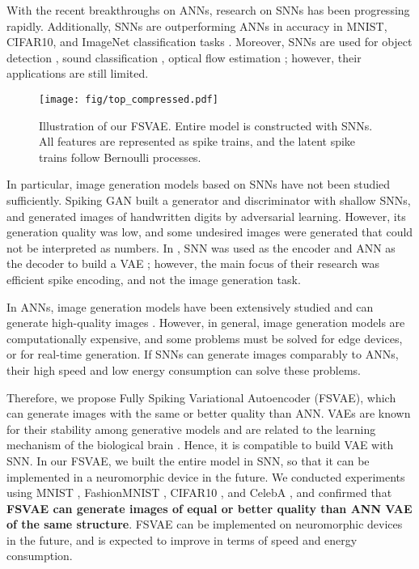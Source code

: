 \documentclass[letterpaper]{article} %
\begin{document}
With the recent breakthroughs on ANNs, research on SNNs has been progressing rapidly. Additionally, SNNs are outperforming ANNs in accuracy in MNIST, CIFAR10, and ImageNet classification tasks \cite{zheng2020going, tsslbp}. Moreover, SNNs are used for object detection \cite{spikingyolo}, sound classification \cite{soundclassification}, optical flow estimation \cite{opticalflow}; however, their applications are still limited.

\begin{figure}[t]
    \centering
    \texttt{[image: fig/top\_compressed.pdf]} 
    \caption{Illustration of our FSVAE. Entire model is constructed with SNNs. All features are represented as spike trains, and the latent spike trains follow Bernoulli processes.}
    \label{fig:top}
\end{figure}

In particular, image generation models based on SNNs have not been studied sufficiently. Spiking GAN \cite{spikinggan} built a generator and discriminator with shallow SNNs, and generated images of handwritten digits by adversarial learning. However, its generation quality was low, and some undesired images were generated that could not be interpreted as numbers. In \cite{dib}, SNN was used as the encoder and ANN as the decoder to build a VAE \cite{vae}; however, the main focus of their research was efficient spike encoding, and not the image generation task.

In ANNs, image generation models have been extensively studied and can generate high-quality images \cite{vqvae2, stylegan2}. However, in general, image generation models are computationally expensive, and some problems must be solved for edge devices, or for real-time generation. If SNNs can generate images comparably to ANNs, their high speed and low energy consumption can solve these problems.

Therefore, we propose Fully Spiking Variational Autoencoder (FSVAE), which can generate images with the same or better quality than ANN. VAEs are known for their stability among generative models and are related to the learning mechanism of the biological brain \cite{Han214247}. Hence, it is compatible to build VAE with SNN.
In our FSVAE, we built the entire model in SNN, so that it can be implemented in a neuromorphic device in the future. We conducted experiments using MNIST \cite{mnist}, FashionMNIST \cite{fashionmnist}, CIFAR10 \cite{cifar10}, and CelebA \cite{celeba}, and confirmed that \textbf{FSVAE can generate images of equal or better quality than ANN VAE of the same structure}. FSVAE can be implemented on neuromorphic devices in the future, and is expected to improve in terms of speed and energy consumption.
\end{document}
